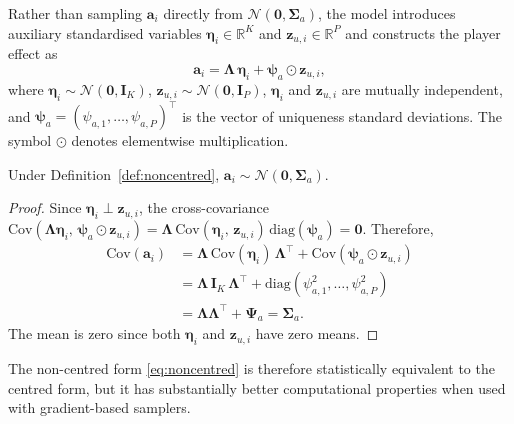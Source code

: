 \begin{definition}
\label{def:noncentred}
Rather than sampling $\mathbf{a}_i$ directly from $\mathcal{N}(\mathbf{0}, \boldsymbol{\Sigma}_a)$, the model introduces auxiliary standardised variables $\boldsymbol{\eta}_i \in \mathbb{R}^K$ and $\mathbf{z}_{u,i} \in \mathbb{R}^P$ and constructs the player effect as
\begin{equation}
\mathbf{a}_i = \boldsymbol{\Lambda}\,\boldsymbol{\eta}_i + \boldsymbol{\psi}_a \odot \mathbf{z}_{u,i},
\label{eq:noncentred}
\end{equation}
where $\boldsymbol{\eta}_i \sim \mathcal{N}(\mathbf{0}, \mathbf{I}_K)$, $\mathbf{z}_{u,i} \sim \mathcal{N}(\mathbf{0}, \mathbf{I}_P)$, $\boldsymbol{\eta}_i$ and $\mathbf{z}_{u,i}$ are mutually independent, and $\boldsymbol{\psi}_a = (\psi_{a,1}, \ldots, \psi_{a,P})^\top$ is the vector of uniqueness standard deviations. The symbol $\odot$ denotes elementwise multiplication.
\end{definition}

\begin{proposition}
\label{prop:noncentred_equiv}
Under Definition~\ref{def:noncentred}, $\mathbf{a}_i \sim \mathcal{N}(\mathbf{0}, \boldsymbol{\Sigma}_a)$.
\end{proposition}
\begin{proof}
Since $\boldsymbol{\eta}_i \perp \mathbf{z}_{u,i}$, the cross-covariance $\mathrm{Cov}(\boldsymbol{\Lambda}\boldsymbol{\eta}_i,\, \boldsymbol{\psi}_a \odot \mathbf{z}_{u,i}) = \boldsymbol{\Lambda}\,\mathrm{Cov}(\boldsymbol{\eta}_i,\, \mathbf{z}_{u,i})\,\mathrm{diag}(\boldsymbol{\psi}_a) = \mathbf{0}$. Therefore,
\begin{align*}
\mathrm{Cov}(\mathbf{a}_i)
&= \boldsymbol{\Lambda}\,\mathrm{Cov}(\boldsymbol{\eta}_i)\,\boldsymbol{\Lambda}^\top + \mathrm{Cov}(\boldsymbol{\psi}_a \odot \mathbf{z}_{u,i}) \\
&= \boldsymbol{\Lambda}\,\mathbf{I}_K\,\boldsymbol{\Lambda}^\top + \mathrm{diag}(\psi_{a,1}^2, \ldots, \psi_{a,P}^2) \\
&= \boldsymbol{\Lambda}\boldsymbol{\Lambda}^\top + \boldsymbol{\Psi}_a = \boldsymbol{\Sigma}_a.
\end{align*}
The mean is zero since both $\boldsymbol{\eta}_i$ and $\mathbf{z}_{u,i}$ have zero means.
\end{proof}

The non-centred form \eqref{eq:noncentred} is therefore statistically equivalent to the centred form, but it has substantially better computational properties when used with gradient-based samplers.

